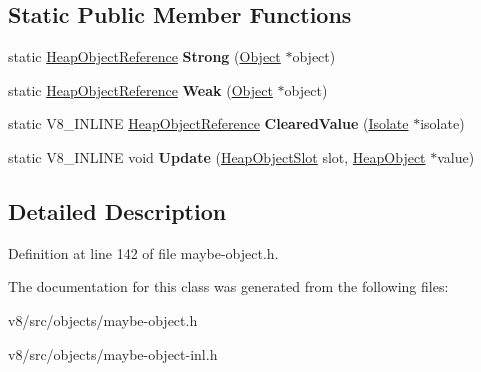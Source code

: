 \subsection*{Static Public Member Functions}
\begin{DoxyCompactItemize}
\item 
\mbox{\label{classv8_1_1internal_1_1HeapObjectReference_a3bd239a2c78a05b4a9e6997226be8ebd}} 
static \mbox{\hyperlink{classv8_1_1internal_1_1HeapObjectReference}{Heap\+Object\+Reference}} {\bfseries Strong} (\mbox{\hyperlink{classv8_1_1internal_1_1Object}{Object}} $\ast$object)
\item 
\mbox{\label{classv8_1_1internal_1_1HeapObjectReference_a03ef77f75e09c6cdb986f236d8310820}} 
static \mbox{\hyperlink{classv8_1_1internal_1_1HeapObjectReference}{Heap\+Object\+Reference}} {\bfseries Weak} (\mbox{\hyperlink{classv8_1_1internal_1_1Object}{Object}} $\ast$object)
\item 
\mbox{\label{classv8_1_1internal_1_1HeapObjectReference_a6654dee3a0ef85f3a4100fbed0e15685}} 
static V8\+\_\+\+I\+N\+L\+I\+NE \mbox{\hyperlink{classv8_1_1internal_1_1HeapObjectReference}{Heap\+Object\+Reference}} {\bfseries Cleared\+Value} (\mbox{\hyperlink{classv8_1_1internal_1_1Isolate}{Isolate}} $\ast$isolate)
\item 
\mbox{\label{classv8_1_1internal_1_1HeapObjectReference_ac1410e15cdb7f9b7a2e9f5e4dc80fa3e}} 
static V8\+\_\+\+I\+N\+L\+I\+NE void {\bfseries Update} (\mbox{\hyperlink{classv8_1_1internal_1_1HeapObjectSlot}{Heap\+Object\+Slot}} slot, \mbox{\hyperlink{classv8_1_1internal_1_1HeapObject}{Heap\+Object}} $\ast$value)
\end{DoxyCompactItemize}


\subsection{Detailed Description}


Definition at line 142 of file maybe-\/object.\+h.



The documentation for this class was generated from the following files\+:\begin{DoxyCompactItemize}
\item 
v8/src/objects/maybe-\/object.\+h\item 
v8/src/objects/maybe-\/object-\/inl.\+h\end{DoxyCompactItemize}
